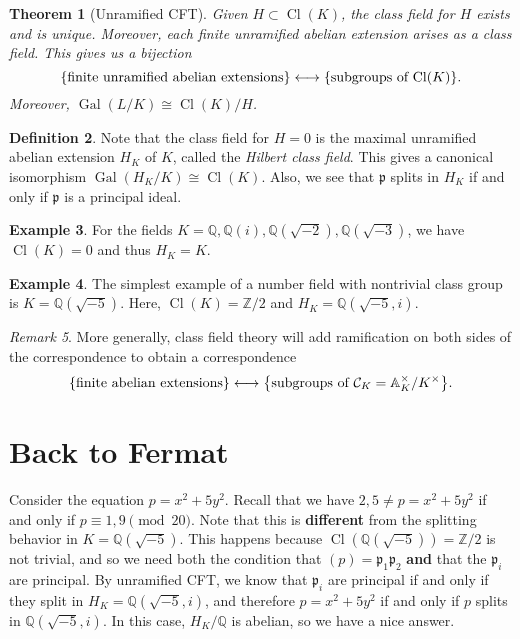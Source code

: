 \documentclass[leqno, openany]{memoir}
\newtheorem{thm}{Theorem}[section]
\theoremstyle{definition}
\newtheorem{defn}[thm]{Definition}
\newtheorem{exm}[thm]{Example}
\theoremstyle{remark}
\newtheorem{rmk}[thm]{Remark}
\theoremstyle{plain}
\theoremstyle{definition}
\theoremstyle{remark}
\newcommand{\A}{\mathbb{A}}
\newcommand{\Z}{\mathbb{Z}}
\newcommand{\Q}{\mathbb{Q}}
\newcommand{\mc}[1]{\mathcal{#1}}
\newcommand{\mf}[1]{\mathfrak{#1}}
\DeclareMathOperator{\Gal}{Gal}
\DeclareMathOperator{\Cl}{Cl}
\begin{document}
\begin{thm}[Unramified CFT]
    Given $H \subset \Cl(K)$, the class field for $H$ exists and is unique. Moreover, each finite unramified abelian extension arises as a class field. This gives us a bijection
    \[ \qty{\text{finite unramified abelian extensions}} \longleftrightarrow \qty{\text{subgroups of $\Cl(K)$}}. \]
    Moreover, $\Gal(L/K) \cong \Cl(K) / H$.
\end{thm}

\begin{defn}
    Note that the class field for $H = 0$ is the maximal unramified abelian extension $H_K$ of $K$, called the \textit{Hilbert class field}. This gives a canonical isomorphism $\Gal(H_K/K) \cong \Cl(K)$. Also, we see that $\mf{p}$ splits in $H_K$ if and only if $\mf{p}$ is a principal ideal.
\end{defn}

\begin{exm}
    For the fields $K = \Q, \Q(i), \Q(\sqrt{-2}), \Q(\sqrt{-3})$, we have $\Cl(K) = 0$ and thus $H_K = K$.
\end{exm}

\begin{exm}
    The simplest example of a number field with nontrivial class group is $K = \Q(\sqrt{-5})$. Here, $\Cl(K) = \Z/2$ and $H_K = \Q(\sqrt{-5}, i)$.
\end{exm}

\begin{rmk}
    More generally, class field theory will add ramification on both sides of the correspondence to obtain a correspondence
    \[ \qty{\text{finite abelian extensions}} \longleftrightarrow \qty{\text{subgroups of $\mc{C}_K = \A_K^{\times}/K^{\times}$}}. \]
\end{rmk}

\section{Back to Fermat}%
\label{sec:back_to_fermat}

Consider the equation $p = x^2 + 5y^2$. Recall that we have $2,5 \neq p = x^2 + 5y^2$ if and only if $p \equiv 1,9 \pmod 20$. Note that this is \textbf{different} from the splitting behavior in $K = \Q(\sqrt{-5})$. This happens because $\Cl(\Q(\sqrt{-5})) = \Z/2$ is not trivial, and so we need both the condition that $(p) = \mf{p}_1 \mf{p}_2$ \textbf{and} that the $\mf{p} _i$ are principal. By unramified CFT, we know that $\mf{p}_i$ are principal if and only if they split in $H_K = \Q(\sqrt{-5}, i)$, and therefore $p = x^2 + 5y^2$ if and only if $p$ splits in $\Q(\sqrt{-5}, i)$. In this case, $H_K/\Q$ is abelian, so we have a nice answer.
\end{document}

